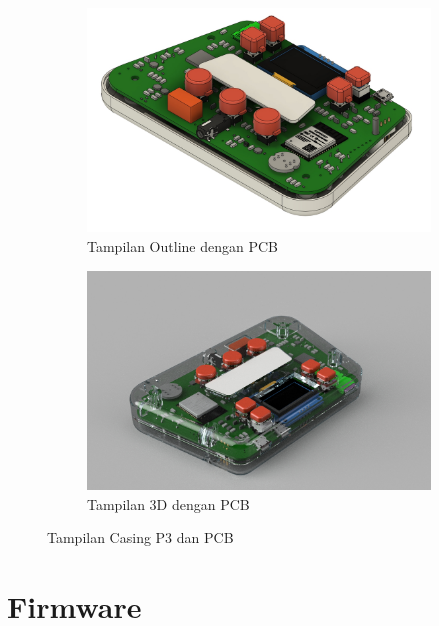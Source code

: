 \documentclass{book} %
\begin{document}
	\begin{figure}[!ht]
		\centering
		\begin{subfigure}[t]{0.45\textwidth}
			\includegraphics[width=\textwidth]{images/p3_casing_pcb}
			\caption{Tampilan Outline dengan PCB}
		\end{subfigure}
		\begin{subfigure}[t]{0.45\textwidth}
			\includegraphics[width=\textwidth]{images/p3_casing_trans}
			\caption{Tampilan 3D dengan PCB}
		\end{subfigure}
		\caption{Tampilan Casing P3 dan PCB}
	\end{figure}
    
    \chapter{Firmware}
\end{document}

